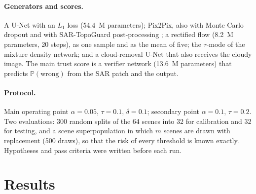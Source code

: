 \documentclass[11pt,a4paper]{article}
\theoremstyle{definition}
\theoremstyle{remark}
\newcommand{\Prob}{\mathbb{P}}
\newcommand{\1}{\mathbf{1}}
\begin{document}
\paragraph{Generators and scores.} A U-Net with an $L_1$ loss (54.4~M parameters); Pix2Pix, also with Monte Carlo dropout and with SAR-TopoGuard post-processing \cite{topoguard}; a rectified flow \cite{rectflow} (8.2~M parameters, 20 steps), as one sample and as the mean of five; the $\tau$-mode of the mixture density network; and a cloud-removal U-Net that also receives the cloudy image. The main trust score is a verifier network (13.6~M parameters) that predicts $\Prob(\text{wrong})$ from the SAR patch and the output.

\paragraph{Protocol.} Main operating point $\alpha=0.05$, $\tau=0.1$, $\delta=0.1$; secondary point $\alpha=0.1$, $\tau=0.2$. Two evaluations: 300 random splits of the 64 scenes into 32 for calibration and 32 for testing, and a scene superpopulation in which $m$ scenes are drawn with replacement (500 draws), so that the risk of every threshold is known exactly. Hypotheses and pass criteria were written before each run.

\section{Results}
\end{document}
